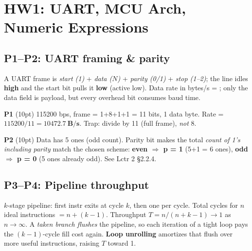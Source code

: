 \section{HW1: UART, MCU Arch, Numeric Expressions}

\subsection{P1--P2: UART framing \& parity}
A UART frame is \emph{start (1)} + \emph{data ($N$)} + \emph{parity (0/1)} + \emph{stop (1--2)}; the line idles \textbf{high} and the start bit pulls it \textbf{low} (active low). Data rate in bytes/s = ; only the data field is payload, but every overhead bit consumes baud time.
\begin{hwp}
\textbf{P1} (10pt) 115200 bps, frame = 1+8+1+1 = 11 bits, 1 data byte. Rate = $115200/11 = \mathbf{10472.7~B/s}$. Trap: divide by 11 (full frame), \emph{not} 8.
\end{hwp}
\begin{hwp}
\textbf{P2} (10pt) Data  has 5 ones (odd count). Parity bit makes the total \emph{count of 1's including parity} match the chosen scheme: \textbf{even $\Rightarrow$ p = 1} (5+1 = 6 ones), \textbf{odd $\Rightarrow$ p = 0} (5 ones already odd). See Lctr 2 \S 2.2.4.
\end{hwp}

\subsection{P3--P4: Pipeline throughput}
$k$-stage pipeline: first instr exits at cycle $k$, then one per cycle. Total cycles for $n$ ideal instructions $= n + (k-1)$. Throughput $T = n/(n+k-1) \to 1$ as $n\to\infty$. A \emph{taken branch flushes} the pipeline, so each iteration of a tight loop pays the $(k{-}1)$-cycle fill cost again. \textbf{Loop unrolling} amortizes that flush over more useful instructions, raising $T$ toward 1.

